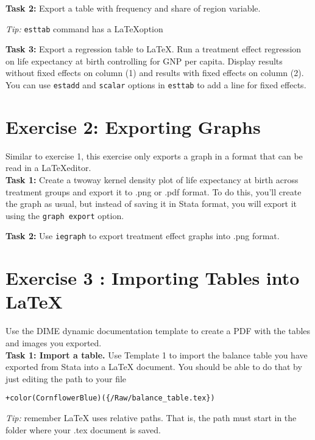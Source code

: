 \documentclass[12pts]{report}
\begin{document}
\textbf{Task 2:}  Export a table with frequency and share of region variable. 
\begin{center}
	\textcolor{BurntOrange}{\emph{Tip:} \texttt{esttab} command has a \LaTeX\space option}
\end{center}

\textbf{Task 3:} Export a regression table to \LaTeX. Run a treatment effect regression on life expectancy at birth controlling for GNP per capita. Display results without fixed effects on column (1) and results with fixed effects on column (2). You can use \texttt{estadd} and \texttt{scalar} options in \texttt{esttab} to add a line for fixed effects.

\section*{Exercise 2: Exporting Graphs}
Similar to exercise 1, this exercise only exports a graph in a format that can be read in a \LaTeX\space editor. \\

\textbf{Task 1:}  Create a twoway kernel density plot of life expectancy at birth across treatment groups and export it to .png or .pdf format. To do this, you'll create the graph as usual, but instead of saving it in Stata format, you will export it using the \texttt{graph export} option. 

\textbf{Task 2:}  Use \texttt{iegraph} to export treatment effect graphs into .png format.

\section*{Exercise 3 : Importing Tables into \LaTeX}
Use the DIME dynamic documentation template to create a PDF with the tables and images you exported.\\

\textbf{Task 1: Import a table.} Use Template 1 to import the balance table you have exported from Stata into a {\LaTeX} document. You should be able to do that by just editing the path to your file
\begin{center}
\begin{Verbatim}[commandchars=+\(\)]
	+color(CornflowerBlue)({/Raw/balance_table.tex})
\end{Verbatim}
\end{center}

\begin{center}
	\textcolor{BurntOrange}{\emph{Tip:} remember {\LaTeX} uses relative paths. That is, the path must start in the folder where your .tex document is saved.}
\end{center}
		
\end{document}
